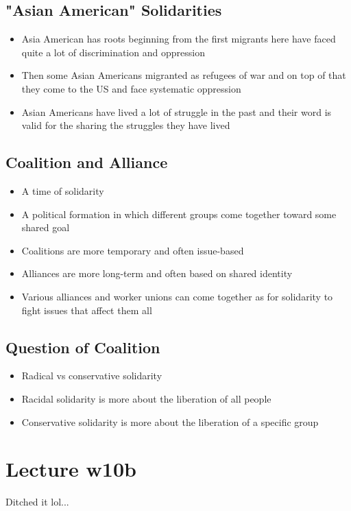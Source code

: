 \documentclass{article}
\begin{document}
\subsection{"Asian American" Solidarities}
\begin{itemize}
  \item Asia American has roots beginning from the first migrants here have
    faced quite a lot of discrimination and oppression
  \item Then some Asian Americans migranted as refugees of war and on top of that
    they come to the US and face systematic oppression
  \item Asian Americans have lived a lot of struggle in the past and
    their word is valid for the sharing the struggles they have lived
\end{itemize}

\subsection{Coalition and Alliance}
\begin{itemize}
  \item A time of solidarity
  \item A political formation in which different groups come together toward
    some shared goal
  \item Coalitions are more temporary and often issue-based
  \item Alliances are more long-term and often based on shared identity
  \item Various alliances and worker unions can come together
    as for solidarity to fight issues that affect them all
\end{itemize}

\subsection{Question of Coalition}
\begin{itemize}
  \item Radical vs conservative solidarity
  \item Racidal solidarity is more about the liberation of all people
  \item Conservative solidarity is more about the liberation of a specific group
\end{itemize}

\section*{Lecture w10b}
Ditched it lol...
\end{document}
